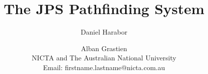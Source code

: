 \documentclass{article}
\begin{document}
\title{The JPS Pathfinding System}
\author{Daniel Harabor \and Alban Grastien \\
NICTA and The Australian National University \\
Email: firstname.lastname@nicta.com.au}
\maketitle










\end{document}
